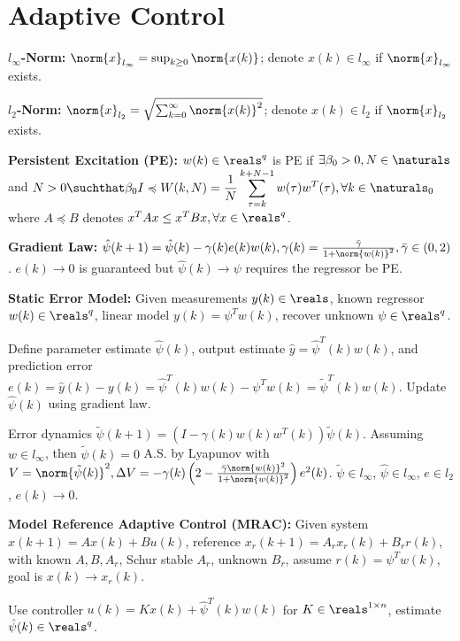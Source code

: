 \documentclass[twocolumn, 8pt]{extarticle}
\begin{document}
\section{Adaptive Control} %

\textbf{$l_\infty$-Norm:} $\norm{x}_{l_\infty} = \sup _{k \geq 0}\norm{x(k)}$; denote $x(k) \in l_\infty$ if $\norm{x}_{l_\infty}$ exists.

\textbf{$l_2$-Norm:} $\norm{x}_{l_2} = \sqrt{\sum _{k = 0}^\infty \norm{x(k)}^2}$; denote $x(k) \in l_2$ if $\norm{x}_{l_2}$ exists.

\textbf{Persistent Excitation (PE):} $w(k) \in \reals^q$ is PE if
$\exists \beta _0 > 0, N \in \naturals$ and $N > 0 \suchthat \displaystyle \beta _0I \preccurlyeq W(k, N) = \frac{1}{N}\sum _{\tau = k}^{k + N - 1} w(\tau)w^T(\tau), \forall k \in \naturals _0$
where $A \preccurlyeq B$ denotes $x^TAx \leq x^TBx, \forall x \in \reals^q$.

\textbf{Gradient Law:} $\hat\psi(k + 1) = \hat\psi(k) - \gamma(k)e(k)w(k), \gamma(k) = \frac{\bar\gamma}{1 + \norm{w(k)}^2}, \bar\gamma \in (0, 2)$.
\(e(k) \to 0\) is guaranteed but \(\hat\psi(k) \to \psi\) requires the regressor be PE.

\textbf{Static Error Model:} Given measurements \(y(k) \in \reals\), known regressor \(w(k) \in \reals^q\), linear model
\(y(k) = \psi^Tw(k)\), recover unknown \(\psi \in \reals^q\).

Define parameter estimate \(\hat\psi(k)\), output estimate \(\hat y = \hat\psi^T(k)w(k)\), and prediction error \(e(k) =
\hat y(k) - y(k) = \hat\psi^T(k)w(k) - \psi^Tw(k) = \tilde\psi^T(k)w(k)\).
Update \(\hat\psi(k)\) using gradient law.

Error dynamics \(\tilde\psi(k + 1) = (I - \gamma(k)w(k)w^T(k))\tilde\psi(k)\). Assuming \(w \in l_\infty\), then
\(\tilde\psi(k) = 0\) A.S. by Lyapunov with \(V = \norm{\tilde\psi(k)}^2, \Delta V = -\gamma(k)\left(2 -
\frac{\bar\gamma\norm{w(k)}^2}{1 + \norm{w(k)}^2}\right)e^2(k)\). \(\tilde\psi \in l_\infty\), \(\hat\psi \in
l_\infty\), \(e \in l_2\), \(e(k) \to 0\).

\textbf{Model Reference Adaptive Control (MRAC):} Given system \(x(k + 1) = Ax(k) + Bu(k)\), reference \(x_r(k + 1) = A_rx_r(k) + B_rr(k)\),
with known \(A, B, A_r\), Schur stable \(A_r\), unknown \(B_r\), assume \(r(k) = \psi^Tw(k)\), goal is \(x(k) \to x_r(k)\).

Use controller \(u(k) = Kx(k) + \hat\psi^T(k)w(k)\) for \(K \in \reals^{1 \times n}\), estimate \(\hat\psi(k) \in \reals^q\).
\end{document}
